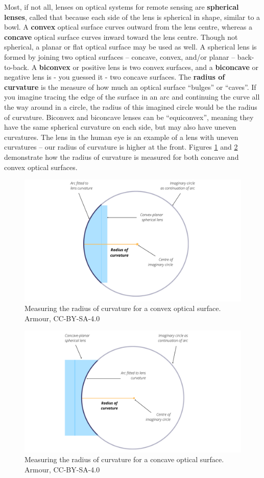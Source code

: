 \documentclass[
]{book}
\begin{document}
Most, if not all, lenses on optical systems for remote sensing are \textbf{spherical lenses}, called that because each side of the lens is spherical in shape, similar to a bowl. A \textbf{convex} optical surface curves outward from the lens centre, whereas a \textbf{concave} optical surface curves inward toward the lens centre. Though not spherical, a planar or flat optical surface may be used as well. A spherical lens is formed by joining two optical surfaces -- concave, convex, and/or planar -- back-to-back. A \textbf{biconvex} or positive lens is two convex surfaces, and a \textbf{biconcave} or negative lens is - you guessed it - two concave surfaces. The \textbf{radius of curvature} is the measure of how much an optical surface ``bulges'' or ``caves''. If you imagine tracing the edge of the surface in an arc and continuing the curve all the way around in a circle, the radius of this imagined circle would be the radius of curvature. Biconvex and biconcave lenses can be ``equiconvex'', meaning they have the same spherical curvature on each side, but may also have uneven curvatures. The lens in the human eye is an example of a lens with uneven curvatures -- our radius of curvature is higher at the front. Figures \ref{fig:12-RoC-convex} and \ref{fig:12-RoC-concave} demonstrate how the radius of curvature is measured for both concave and convex optical surfaces.

\begin{figure}
\includegraphics[width=0.9\linewidth]{images/12-ROC_convex} \caption{Measuring the radius of curvature for a convex optical surface. Armour, CC-BY-SA-4.0}\label{fig:12-RoC-convex}
\end{figure}

\begin{figure}
\includegraphics[width=0.9\linewidth]{images/12-ROC_concave} \caption{Measuring the radius of curvature for a concave optical surface. Armour, CC-BY-SA-4.0}\label{fig:12-RoC-concave}
\end{figure}
\end{document}

